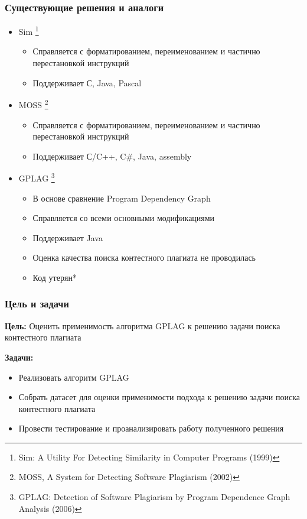 \documentclass[10pt]{beamer}
\begin{document}
\begin{frame}[fragile]\frametitle{Существующие решения и аналоги}
	\begin{itemize}
		\item Sim \footnote[frame]{Sim: A Utility For Detecting Similarity in Computer Programs (1999)}
		\begin{itemize}
			\item Справляется с форматированием, переименованием и частично перестановкой инструкций
			\item Поддерживает С, Java, Pascal
		\end{itemize}
	    \item MOSS \footnote[frame]{MOSS, A System for Detecting Software Plagiarism (2002)}
	    \begin{itemize}
	    	\item Справляется с форматированием, переименованием и частично перестановкой инструкций
	    	\item Поддерживает С/C++, C#, Java, assembly
	    \end{itemize}
		\item GPLAG \footnote[frame]{GPLAG: Detection of Software Plagiarism by Program Dependence Graph Analysis (2006)}
		\begin{itemize}
			\item В основе сравнение Program Dependency Graph
			\item Справляется со всеми основными модификациями
			\item Поддерживает Java
			\item Оценка качества поиска контестного плагиата не проводилась
			\item Код утерян*
		\end{itemize}
	\end{itemize}
\end{frame}

\begin{frame}\frametitle{Цель и задачи}
    \textbf{Цель:} Оценить применимость алгоритма GPLAG к решению задачи поиска контестного плагиата
    
    \textbf{Задачи:}
    \begin{itemize}
        \item Реализовать алгоритм GPLAG
        \item Собрать датасет для оценки применимости подхода к решению задачи поиска контестного плагиата
        \item Провести тестирование и проанализировать работу полученного решения
    \end{itemize}
\end{frame}
\end{document}
